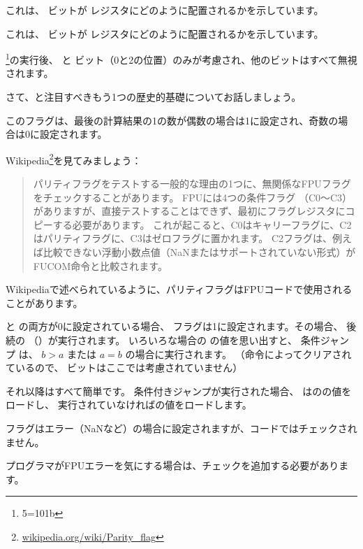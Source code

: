 これは、 \CThreeBits ビットが \AX レジスタにどのように配置されるかを示しています。



これは、 \CThreeBits ビットが \AH レジスタにどのように配置されるかを示しています。



\footnote{5=101b}の実行後、
\Czero と \Ctwo ビット（0と2の位置）のみが考慮され、他のビットはすべて無視されます。

\label{parity_flag}

さて、と注目すべきもう1つの歴史的基礎についてお話しましょう。

このフラグは、最後の計算結果の1の数が偶数の場合は1に設定され、奇数の場合は0に設定されます。

Wikipedia\footnote{\href{http://go.yurichev.com/17131}{wikipedia.org/wiki/Parity\_flag}}を見てみましょう：

\begin{framed}
\begin{quotation}
パリティフラグをテストする一般的な理由の1つに、無関係なFPUフラグをチェックすることがあります。 FPUには4つの条件フラグ
（C0～C3）がありますが、直接テストすることはできず、最初にフラグレジスタにコピーする必要があります。 
これが起こると、C0はキャリーフラグに、C2はパリティフラグに、C3はゼロフラグに置かれます。 
C2フラグは、例えば比較できない浮動小数点値（NaNまたはサポートされていない形式）がFUCOM命令と比較されます。
\end{quotation}
\end{framed}

Wikipediaで述べられているように、パリティフラグはFPUコードで使用されることがあります。


\Czero と \Ctwo の両方が0に設定されている場合、 \PF フラグは1に設定されます。その場合、
後続の \JP （）が実行されます。 
いろいろな場合の \CThreeBits の値を思い出すと、
条件ジャンプ \JP は、 $b>a$ または $a=b$ の場合に実行されます。
（命令によってクリアされているので、 \Cthree ビットはここでは考慮されていません）

それ以降はすべて簡単です。 
条件付きジャンプが実行された場合、
\FLD はのの値をロードし、
実行されていなければの値をロードします。


\Ctwo フラグはエラー（\gls{NaN}など）の場合に設定されますが、コードではチェックされません。

プログラマがFPUエラーを気にする場合は、チェックを追加する必要があります。


